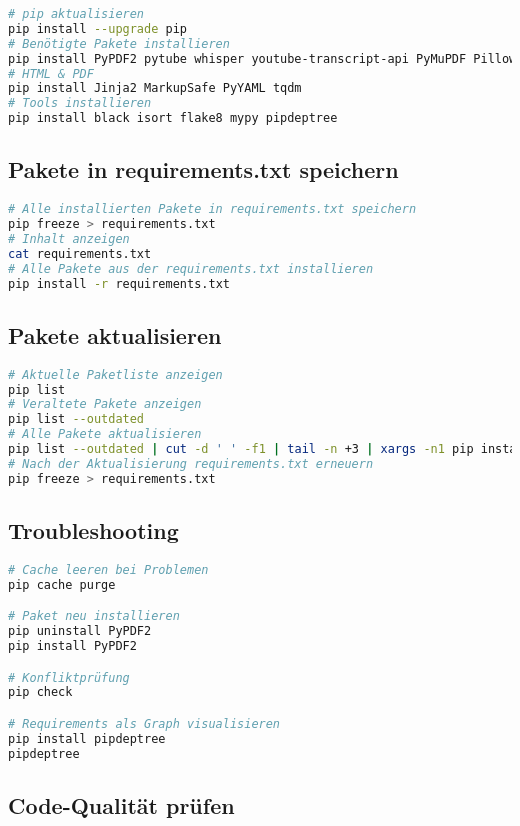 \documentclass{vorlage-design-main}
\begin{document}
\begin{lstlisting}[language=bash]
# pip aktualisieren
pip install --upgrade pip
# Benötigte Pakete installieren
pip install PyPDF2 pytube whisper youtube-transcript-api PyMuPDF Pillow rich
# HTML & PDF
pip install Jinja2 MarkupSafe PyYAML tqdm
# Tools installieren
pip install black isort flake8 mypy pipdeptree
\end{lstlisting}

\subsection{Pakete in requirements.txt
speichern}\label{pakete-in-requirements.txt-speichern}

\begin{lstlisting}[language=bash]
# Alle installierten Pakete in requirements.txt speichern
pip freeze > requirements.txt
# Inhalt anzeigen
cat requirements.txt
# Alle Pakete aus der requirements.txt installieren
pip install -r requirements.txt
\end{lstlisting}

\subsection{Pakete aktualisieren}\label{pakete-aktualisieren}

\begin{lstlisting}[language=bash]
# Aktuelle Paketliste anzeigen
pip list
# Veraltete Pakete anzeigen
pip list --outdated
# Alle Pakete aktualisieren
pip list --outdated | cut -d ' ' -f1 | tail -n +3 | xargs -n1 pip install -U
# Nach der Aktualisierung requirements.txt erneuern
pip freeze > requirements.txt
\end{lstlisting}

\subsection{Troubleshooting}\label{troubleshooting}

\begin{lstlisting}[language=bash]
# Cache leeren bei Problemen
pip cache purge

# Paket neu installieren
pip uninstall PyPDF2
pip install PyPDF2

# Konfliktprüfung
pip check

# Requirements als Graph visualisieren
pip install pipdeptree
pipdeptree
\end{lstlisting}

\subsection{Code-Qualität prüfen}\label{code-qualitaet-pruefen}
\end{document}
